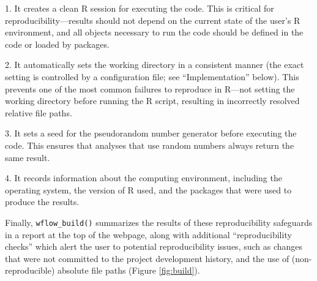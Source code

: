 \documentclass[9pt,a4paper]{extarticle}
\begin{document}
1. It creates a clean R session for executing the code. This is critical
for reproducibility—results should not depend on the current state of
the user's R environment, and all objects necessary to run the code
should be defined in the code or loaded by packages.

2. It automatically sets the working directory in a consistent manner
(the exact setting is controlled by a configuration file; see
``Implementation'' below). This prevents one of the most common failures
to reproduce in R—not setting the working directory before running the R
script, resulting in incorrectly resolved relative file paths.

3. It sets a seed for the pseudorandom number generator before executing
the code. This ensures that analyses that use random numbers always
return the same result.

4. It records information about the computing environment, including the
operating system, the version of R used, and the packages that were used
to produce the results.

Finally, \texttt{wflow\_build()} summarizes the results of these reproducibility
safeguards in a report at the top of the webpage, along with additional
``reproducibility checks'' which alert the user to potential
reproducibility issues, such as changes that were not committed to the
project development history, and the use of (non-reproducible) absolute
file paths (Figure \ref{fig:build}).
\end{document}
